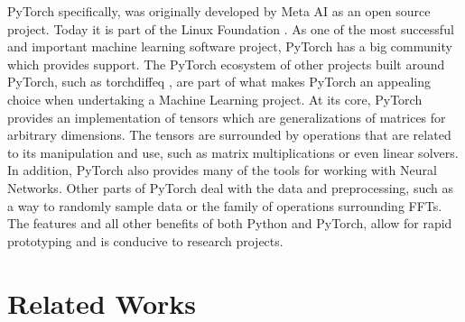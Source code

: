 PyTorch specifically, was originally developed by Meta AI as an open source project. Today it is part of the Linux Foundation \autocite{jimzemlinWelcomingPyTorchLinux2022}. As one of the most successful and important machine learning software project, PyTorch has a big community which provides support. The PyTorch ecosystem of other projects built around PyTorch, such as torchdiffeq \autocite{Chen_torchdiffeq_2021}, are part of what makes PyTorch an appealing choice when undertaking a Machine Learning project. At its core, PyTorch provides an implementation of tensors which are generalizations of matrices for arbitrary dimensions. The tensors are surrounded by operations that are related to its manipulation and use, such as matrix multiplications or even linear solvers. In addition, PyTorch also provides many of the tools for working with Neural Networks. Other parts of PyTorch deal with the data and preprocessing, such as a way to randomly sample data or the family of operations surrounding FFTs. The features and all other benefits of both Python and PyTorch, allow for rapid prototyping and is conducive to research projects.

\section{Related Works}



